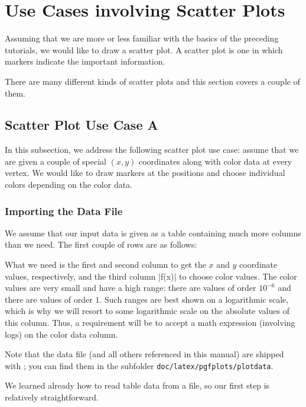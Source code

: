 
\section{Use Cases involving Scatter Plots}

Assuming that we are more or less familiar with the basics of the preceding
tutorials, we would like to draw a scatter plot. A scatter plot is one in which
markers indicate the important information.

There are many different kinds of scatter plots and this section covers a
couple of them.

\subsection{Scatter Plot Use Case A}
\label{sec:tut3:usecaseA}

In this subsection, we address the following scatter plot use case: assume that
we are given a couple of special $(x,y)$ coordinates along with color data at
every vertex. We would like to draw markers at the positions and choose
individual colors depending on the color data.


\subsubsection{Importing the Data File}

We assume that our input data is given as a table containing much more columns
than we need. The first couple of rows are as follows:

    

What we need is the first and second column to get the $x$ and $y$ coordinate
values, respectively, and the third column |f(x)| to choose color values. The
color values are very small and have a high range: there are values of order
$10^{-6}$ and there are values of order $1$. Such ranges are best shown on a
logarithmic scale, which is why we will resort to some logarithmic scale on the
absolute values of this column. Thus, a requirement will be to accept a math
expression (involving logs) on the color data column.

Note that the data file (and all others referenced in this manual) are shipped
with \PGFPlots{}; you can find them in the subfolder
\texttt{doc/latex/pgfplots/plotdata}.

We learned already how to read table data from a file, so our first step is
relatively straightforward.

